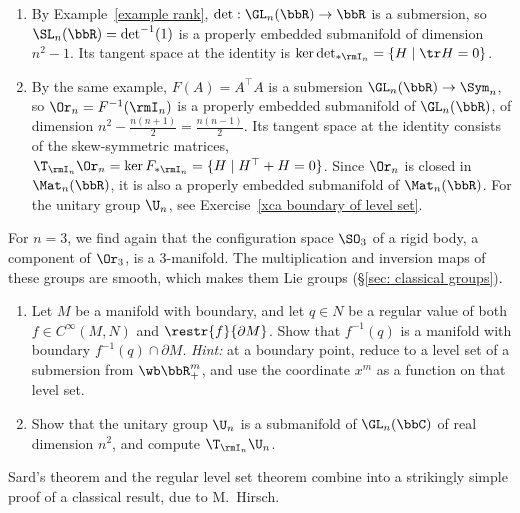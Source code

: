 \begin{example}\label{example classical groups manifolds}
    \begin{enumerate}
        \item By Example~\ref{example rank}, $\det:\GL_n(\bbR)\to\bbR$ is a submersion, so $\SL_n(\bbR)=\det^{-1}(1)$ is a properly embedded submanifold of dimension $n^2-1$. Its tangent space at the identity is $\ker\det\nolimits_{\ast\rmI_n}=\{H\mid\tr H=0\}$.
        \item By the same example, $F(A)=A^\top A$ is a submersion $\GL_n(\bbR)\to\Sym_n$, so $\Or_n=F^{-1}(\rmI_n)$ is a properly embedded submanifold of $\GL_n(\bbR)$, of dimension $n^2-\frac{n(n+1)}2=\frac{n(n-1)}2$. Its tangent space at the identity consists of the skew-symmetric matrices, $\T_{\rmI_n}\Or_n=\ker F_{\ast\rmI_n}=\{H\mid H^\top+H=0\}$. Since $\Or_n$ is closed in $\Mat_n(\bbR)$, it is also a properly embedded submanifold of $\Mat_n(\bbR)$. For the unitary group $\U_n$, see Exercise~\ref{xca boundary of level set}.
    \end{enumerate}
    For $n=3$, we find again that the configuration space $\SO_3$ of a rigid body, a component of $\Or_3$, is a $3$-manifold. The multiplication and inversion maps of these groups are smooth, which makes them Lie groups (\S\ref{sec: classical groups}).
\end{example}

\begin{xca}\label{xca boundary of level set}
    \begin{enumerate}
        \item Let $M$ be a manifold with boundary, and let $q\in N$ be a regular value of both $f\in C^\infty(M,N)$ and $\restr{f}{\partial M}$. Show that $f^{-1}(q)$ is a manifold with boundary $f^{-1}(q)\cap\partial M$. \emph{Hint:} at a boundary point, reduce to a level set of a submersion from $\wb\bbR^m_+$, and use the coordinate $x^m$ as a function on that level set.
        \item Show that the unitary group $\U_n$ is a submanifold of $\GL_n(\bbC)$ of real dimension $n^2$, and compute $\T_{\rmI_n}\U_n$.
    \end{enumerate}
\end{xca}

Sard's theorem and the regular level set theorem combine into a strikingly simple proof of a classical result, due to M.~Hirsch.

